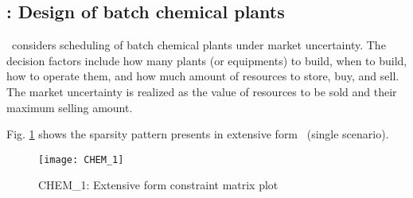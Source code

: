 \subsection{\chem: Design of batch chemical plants} \label{CHEM}
\chem\ considers scheduling of batch chemical plants under market uncertainty. The decision factors include how many plants (or equipments) to build, when to build, how to operate them, and how much amount of resources to store, buy, and sell. The market uncertainty is realized as the value of resources to be sold and their maximum selling amount.

Fig. \ref{fig:chem_sparsity} shows the sparsity pattern presents in extensive form \chem\ (single scenario).
\begin{figure}[H]
	\centering
	\texttt{[image: CHEM\_1]}
	\caption{CHEM\_1: Extensive form constraint matrix plot}
	\label{fig:chem_sparsity}
\end{figure}


